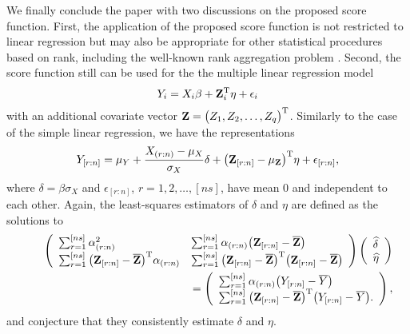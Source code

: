 \documentclass[12pt]{article}
\newcommand{\mZ}{\mathbf{Z}}
\begin{document}
We finally conclude the paper with two discussions on the proposed score function. First, 
the application of 
the proposed score function is not restricted to linear regression but may also be appropriate for other statistical 
procedures based on rank, including the well-known rank aggregation problem 
\citep{Breitling:2004,Eisinga:2013}. Second, the score function still can be used for 
the  the multiple linear regression model
\begin{equation} \nonumber
Y_i = X_i \beta + {\bf Z}_i^{\rm T} \eta+ \epsilon_{i}
\end{equation}
with an additional covariate vector ${\bf Z}=\big(Z_1,Z_2,\ldots,Z_q\big)^{\rm T}$. Similarly to the case of 
the simple linear regression, we have the representations
\begin{equation} \nonumber
Y_{[r:n]} = \mu_Y + \frac{X_{(r:n)}-\mu_X}{\sigma_X}  \delta+ \big(  {\bf Z}_{[r:n]} - \mu_{\mZ} \big)^{\rm T} \eta + \epsilon_{[r:n]},
\end{equation}
where  $\delta=\beta \sigma_X$ and $\epsilon_{[r:n]}$, $r=1,2,\ldots,[ns]$, have mean $0$ and independent to each other.
Again, the least-squares estimators of  
$\delta$ and $\eta$ are defined as the solutions to  
\begin{eqnarray}
&& \begin{pmatrix}
\begin{array}{ll}
\sum_{r=1}^{[ns]} \alpha_{(r:n)}^2 & \sum_{r=1}^{[ns]} \alpha_{(r:n)} \big( \mZ_{[r:n]}-\overline{\mZ} \big) \\
  \sum_{r=1}^{[ns]}  \big( \mZ_{[r:n]}-\overline{\mZ} \big)^{\rm T} \alpha_{(r:n)}
& \sum_{r=1}^{[ns]} \big( \mZ_{[r:n]}-\overline{\mZ} \big)^{\rm T} \big( \mZ_{[r:n]}-\overline{\mZ} \big)
\end{array}
\end{pmatrix}
\begin{pmatrix}
\begin{array}{l}
\widehat{\delta} \\
\widehat{\eta}
\end{array}
\end{pmatrix} \nonumber\\
&& \hskip5cm
=
\begin{pmatrix}
\begin{array}{l}
\sum_{r=1}^{[ns]} \alpha_{(r:n)} \big( Y_{[r:n]} - \overline{Y} \big) \\
\sum_{r=1}^{[ns]}  \big( \mZ_{[r:n]}-\overline{\mZ} \big)^{\rm T} \big( Y_{[r:n]} - \overline{Y} \big).
\end{array}
\end{pmatrix},  \nonumber
\end{eqnarray}
and conjecture that they consistently estimate $\delta$ and $\eta$.
\end{document}
